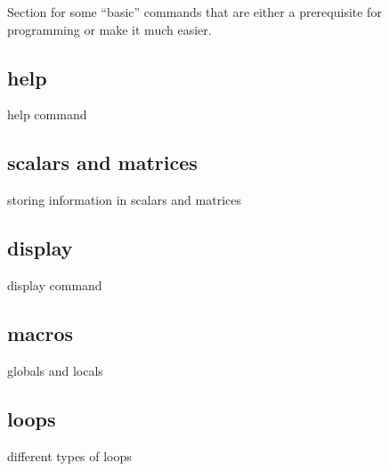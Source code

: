 
Section for some ``basic'' commands that are either a prerequisite for programming or make it much easier.

\subsection{help}

help command

\subsection{scalars and matrices}

storing information in scalars and matrices

\subsection{display}

display command

\subsection{macros}

globals and locals

\subsection{loops}

different types of loops
